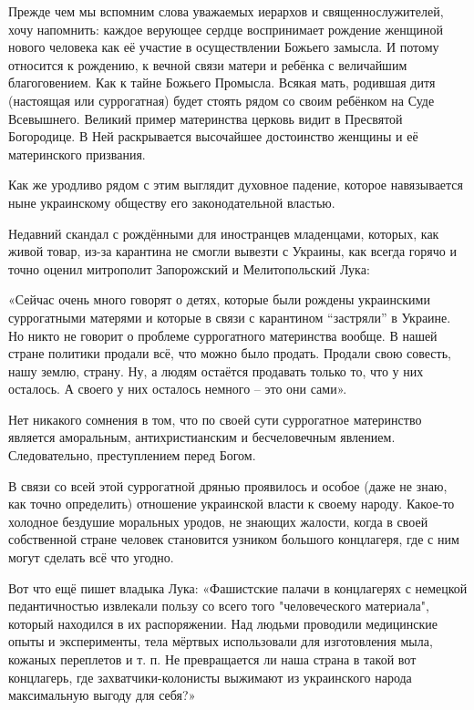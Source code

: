 Прежде чем мы вспомним слова уважаемых иерархов и священнослужителей, хочу
напомнить: каждое верующее сердце воспринимает рождение женщиной нового
человека как её участие в осуществлении Божьего замысла. И потому относится к
рождению, к вечной связи матери и ребёнка с величайшим благоговением. Как к
тайне Божьего Промысла. Всякая мать, родившая дитя (настоящая или суррогатная)
будет стоять рядом со своим ребёнком на Суде Всевышнего. Великий пример
материнства церковь видит в Пресвятой Богородице. В Ней раскрывается высочайшее
достоинство женщины и её материнского призвания.

Как же уродливо рядом с этим выглядит духовное падение, которое навязывается
ныне украинскому обществу его законодательной властью.

Недавний скандал с рождёнными для иностранцев младенцами, которых, как живой
товар, из-за карантина не смогли вывезти с Украины, как всегда горячо и точно
оценил митрополит Запорожский и Мелитопольский Лука:

\begin{zznagolos}
«Сейчас очень много говорят о детях, которые были рождены украинскими
суррогатными матерями и которые в связи с карантином \enquote{застряли} в Украине. Но
никто не говорит о проблеме суррогатного материнства вообще. В нашей стране
политики продали всё, что можно было продать. Продали свою совесть, нашу землю,
страну. Ну, а людям остаётся продавать только то, что у них осталось. А своего
у них осталось немного – это они сами».	
\end{zznagolos}

Нет никакого сомнения в том, что по своей сути суррогатное материнство является
аморальным, антихристианским и бесчеловечным явлением. Следовательно,
преступлением перед Богом.

В связи со всей этой суррогатной дрянью проявилось и особое (даже не знаю, как
точно определить) отношение украинской власти к своему народу. Какое-то
холодное бездушие моральных уродов, не знающих жалости, когда в своей
собственной стране человек становится узником большого концлагеря, где с ним
могут сделать всё что угодно.

Вот что ещё пишет владыка Лука: «Фашистские палачи в концлагерях с немецкой
педантичностью извлекали пользу со всего того "человеческого материала",
который находился в их распоряжении. Над людьми проводили медицинские опыты и
эксперименты, тела мёртвых использовали для изготовления мыла, кожаных
переплетов и т. п. Не превращается ли наша страна в такой вот концлагерь, где
захватчики-колонисты выжимают из украинского народа максимальную выгоду для
себя?»

